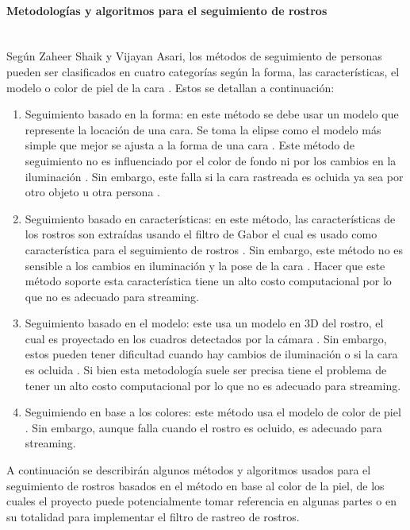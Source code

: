 \documentclass[a4paper,openright,12pt]{report}
\begin{document}
\paragraph{Metodologías y algoritmos para el seguimiento de rostros}\mbox{} \\
Según Zaheer Shaik y Vijayan Asari, los métodos de seguimiento de personas
pueden ser clasificados en cuatro categorías según la forma, las características,
el modelo o color de piel de la cara \cite{shaik2007robust}. Estos se detallan
a continuación:

\begin{enumerate}
    \item Seguimiento basado en la forma: en este método se debe usar un modelo
    que represente la locación de una cara. Se toma la elipse como el modelo más
    simple que mejor se ajusta a la forma de una cara \cite{eleftheriadis1995automatic}. Este método de
    seguimiento no es influenciado por el color de fondo ni por los cambios en
    la iluminación \cite{shaik2007robust}. Sin embargo, este falla si la cara rastreada es ocluida ya
    sea por otro objeto u otra persona \cite{shaik2007robust}.
    \item Seguimiento basado en características:  en este método, las
    características de los rostros son extraídas usando el filtro de Gabor el
    cual es usado como característica para el seguimiento de rostros \cite{shaik2007robust}. Sin
    embargo, este método no es sensible a los cambios en iluminación y la pose
    de la cara \cite{shaik2007robust}. Hacer que este método soporte esta característica tiene un alto
    costo computacional por lo que no es adecuado para streaming.
    \item Seguimiento basado en el modelo: este usa un modelo en 3D del rostro,
    el cual es proyectado en los cuadros detectados por la cámara \cite{shaik2007robust}. Sin embargo,
    estos pueden tener dificultad cuando hay cambios de iluminación o si la cara
    es ocluida \cite{smolyanskiy2014real}. Si bien esta metodología suele ser precisa tiene el problema de
    tener un alto costo computacional por lo que no es adecuado para streaming.
    \item Seguimiendo en base a los colores: este método usa el modelo de color
    de piel \cite{shaik2007robust}. Sin embargo, aunque falla cuando el rostro es ocluido, es adecuado
    para streaming.
\end{enumerate}

A continuación se describirán algunos métodos y algoritmos usados para el
seguimiento de rostros basados en el método en base al color de la piel, de los
cuales el proyecto puede potencialmente tomar referencia en algunas partes o en
su totalidad para implementar el filtro de rastreo de rostros.
\end{document}
